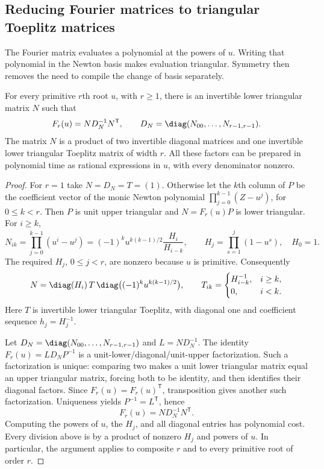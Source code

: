 \subsection{Reducing Fourier matrices to triangular Toeplitz matrices}

The Fourier matrix evaluates a polynomial at the powers of $u$.
Writing that polynomial in the Newton basis makes evaluation triangular.
Symmetry then removes the need to compile the change of basis separately.

\begin{lemma}\label{loc:newton-reduction}
For every primitive $r$th root $u$, with $r\ge1$, there is an invertible
lower triangular matrix $N$ such that
\[
 F_r(u)=N D_N^{-1}N^{\mathsf T},
 \qquad D_N=\diag(N_{00},\ldots,N_{r-1,r-1}).
\]
The matrix $N$ is a product of two invertible diagonal matrices and
one invertible lower triangular Toeplitz matrix of width $r$.
All these factors can be prepared in polynomial time as rational
expressions in $u$, with every denominator nonzero.
\end{lemma}

\begin{proof}
For $r=1$ take $N=D_N=T=(1)$.  Otherwise let the $k$th column of $P$
be the coefficient vector of the monic Newton polynomial
$\prod_{j=0}^{k-1}(Z-u^j)$, for $0\le k<r$.  Then $P$ is unit upper
triangular and $N=F_r(u)P$ is lower triangular.  For $i\ge k$,
\begin{equation}\label{loc:newton}
 N_{ik}=\prod_{j=0}^{k-1}(u^i-u^j)
       =(-1)^ku^{k(k-1)/2}\frac{H_i}{H_{i-k}},
 \qquad H_j=\prod_{s=1}^j(1-u^s),\quad H_0=1.
\end{equation}
The required $H_j$, $0\le j<r$, are nonzero because $u$ is primitive.
Consequently
\[
 N=\diag(H_i)\,T\,
       \diag\bigl((-1)^ku^{k(k-1)/2}\bigr),
 \qquad
 T_{ik}=\begin{cases}H_{i-k}^{-1},&i\ge k,\\0,&i<k.\end{cases}
\]
Here $T$ is invertible lower triangular Toeplitz, with diagonal one
and coefficient sequence $h_j=H_j^{-1}$.

Let $D_N=\diag(N_{00},\ldots,N_{r-1,r-1})$ and $L=ND_N^{-1}$.
The identity $F_r(u)=L D_NP^{-1}$ is a unit-lower/diagonal/unit-upper
factorization.  Such a factorization is unique: comparing two makes
a unit lower triangular matrix equal an upper triangular matrix,
forcing both to be identity, and then identifies their diagonal
factors.  Since $F_r(u)=F_r(u)^{\mathsf T}$, transposition gives another
such factorization.  Uniqueness yields $P^{-1}=L^{\mathsf T}$, hence
\begin{equation}\label{loc:fourier-factorization}
 F_r(u)=N D_N^{-1}N^{\mathsf T}.
\end{equation}
Computing the powers of $u$, the $H_j$, and all diagonal entries has
polynomial cost.  Every division above is by a product of nonzero
$H_j$ and powers of $u$.  In particular, the argument applies to
composite $r$ and to every primitive root of order $r$.
\end{proof}

